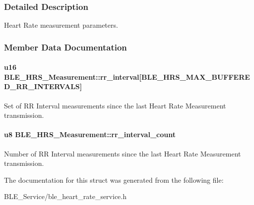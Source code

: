 \subsubsection{Detailed Description}
Heart Rate measurement parameters. 

\subsubsection{Member Data Documentation}
\paragraph[{\texorpdfstring{rr\+\_\+interval}{rr_interval}}]{\setlength{\rightskip}{0pt plus 5cm}u16 B\+L\+E\+\_\+\+H\+R\+S\+\_\+\+Measurement\+::rr\+\_\+interval\mbox{[}{\bf B\+L\+E\+\_\+\+H\+R\+S\+\_\+\+M\+A\+X\+\_\+\+B\+U\+F\+F\+E\+R\+E\+D\+\_\+\+R\+R\+\_\+\+I\+N\+T\+E\+R\+V\+A\+LS}\mbox{]}}\hypertarget{struct_b_l_e___h_r_s___measurement_a1626ff150d9577ee5ea80538e1f4f609}{}\label{struct_b_l_e___h_r_s___measurement_a1626ff150d9577ee5ea80538e1f4f609}
Set of RR Interval measurements since the last Heart Rate Measurement transmission. 
\paragraph[{\texorpdfstring{rr\+\_\+interval\+\_\+count}{rr_interval_count}}]{\setlength{\rightskip}{0pt plus 5cm}u8 B\+L\+E\+\_\+\+H\+R\+S\+\_\+\+Measurement\+::rr\+\_\+interval\+\_\+count}\hypertarget{struct_b_l_e___h_r_s___measurement_a85fda1a6c624db2b9c838e6009f3a62e}{}\label{struct_b_l_e___h_r_s___measurement_a85fda1a6c624db2b9c838e6009f3a62e}
Number of RR Interval measurements since the last Heart Rate Measurement transmission. 

The documentation for this struct was generated from the following file\+:\begin{DoxyCompactItemize}
\item 
B\+L\+E\+\_\+\+Service/ble\+\_\+heart\+\_\+rate\+\_\+service.\+h\end{DoxyCompactItemize}
